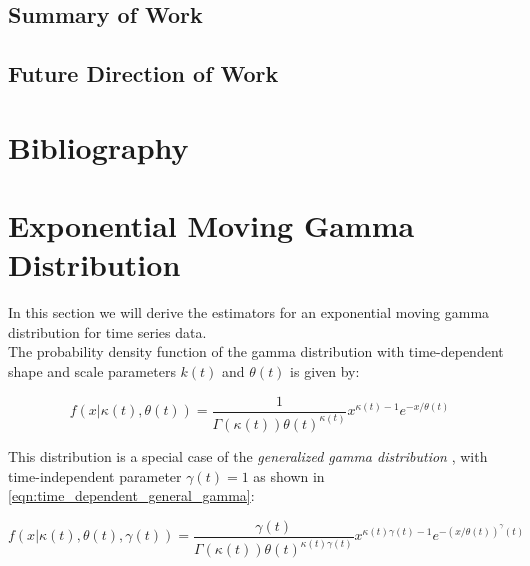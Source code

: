 \documentclass[12pt]{article}
\begin{document}
\subsection{Summary of Work}

\subsection{Future Direction of Work}

\pagebreak

\section{Bibliography}


\pagebreak


\appendix

\section{Exponential Moving Gamma Distribution}
In this section we will derive the estimators for an exponential moving gamma distribution for time series data.\\


The probability density function of the gamma distribution with time-dependent shape and scale parameters $k(t)$ and $\theta(t)$ is given by:

\begin{equation}
f(x|\kappa(t), \theta(t)) = \frac{1}{\Gamma(\kappa(t))\theta(t)^{\kappa(t)}} x^{\kappa(t)-1}e^{-x/\theta(t)}
\label{eqn:time_dependent_gamma}
\end{equation}

\noindent This distribution is a special case of the \textit{generalized gamma distribution} \label{eqn:time_dependent_general_gamma}, with time-independent parameter $\gamma(t) = 1$ as shown in \eqref{eqn:time_dependent_general_gamma}:

\begin{equation}
f(x|\kappa(t), \theta(t), \gamma(t)) = \frac{\gamma(t)}{\Gamma(\kappa(t))\theta(t)^{\kappa(t)\gamma(t)}} x^{\kappa(t)\gamma(t)-1}e^{-(x/\theta(t))^\gamma(t)}
\end{equation}
\end{document}
